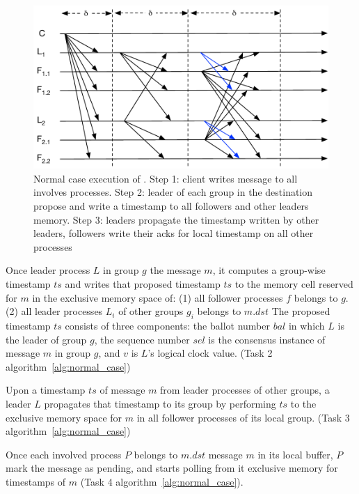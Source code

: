 \begin{figure}[ht!]
  \centering
  \includegraphics[width=1\linewidth]{figures/timeline-simple}
  \caption{Normal case execution of \libname. Step 1: client writes message to all
          involves processes. Step 2: leader of each group in the destination
          propose and write a timestamp to all followers and other leaders
          memory. Step 3: leaders propagate the timestamp written by other
          leaders, followers write their acks for local timestamp on all other
          processes}
  \label{fig:normal_operation_time}
\end{figure}

Once leader process $L$ in group $g$ \lread the message $m$, it computes a
group-wise timestamp $ts$ and writes that proposed timestamp $ts$ to the memory
cell reserved for $m$ in the exclusive memory space of: (1) all follower
processes $f$ belongs to $g$. (2) all leader processes $L_i$ of other groups
$g_i$ belongs to $m.dst$ The proposed timestamp $ts$ consists of three
components: the ballot number $bal$ in which $L$ is the leader of group $g$, the
sequence number $sel$ is the consensus instance of message $m$ in group $g$, and
$v$ is $L$'s logical clock value. (Task 2 algorithm~\ref{alg:normal_case})

Upon \lread a timestamp $ts$ of message $m$ from leader processes of other
groups, a leader $L$ propagates that timestamp to its group by performing
\rwrite $ts$ to the exclusive memory space for $m$ in all follower processes of
its local group. (Task 3 algorithm~\ref{alg:normal_case})

Once each involved process $P$ belongs to $m.dst$ \lread message $m$ in its
local buffer, $P$ mark the message as pending, and starts polling from it
exclusive memory for timestamps of $m$ (Task 4 algorithm~\ref{alg:normal_case}).

